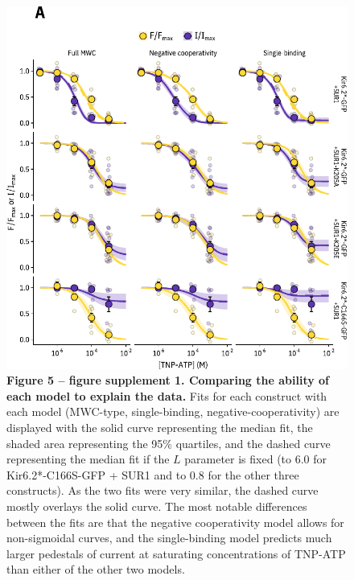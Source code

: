 \documentclass[9pt,lineno, onehalfspacing]{elife_modified}
\begin{document}
\begin{figure}
\begin{fullwidth}
\includegraphics[height=0.75\textheight]{figure_five_s2}
\captionsetup{labelformat=empty}
\caption{
\textbf{Figure 5 -- figure supplement 1. Comparing the ability of each model to explain the data. }
Fits for each construct with each model (MWC-type, single-binding, negative-cooperativity) are displayed with the solid curve representing the median fit, the shaded area representing the 95\% quartiles, and the dashed curve representing the median fit if the $L$ parameter is fixed (to 6.0 for Kir6.2*-C166S-GFP + SUR1 and to 0.8 for the other three constructs).
As the two fits were very similar, the dashed curve mostly overlays the solid curve.
The most notable differences between the fits are that the negative cooperativity model allows for non-sigmoidal curves, and the single-binding model predicts much larger pedestals of current at saturating concentrations of TNP-ATP than either of the other two models.
}
\label{fig:five_s2}
\end{fullwidth}
\end{figure}
\end{document}
